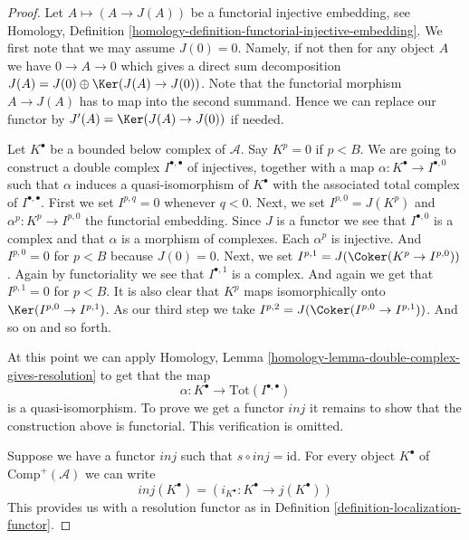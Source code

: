 \begin{proof}
Let $A \mapsto (A \to J(A))$ be a functorial injective embedding, see
Homology, Definition \ref{homology-definition-functorial-injective-embedding}.
We first note that we may assume $J(0) = 0$. Namely, if not then
for any object $A$ we have $0 \to A \to 0$ which gives
a direct sum decomposition $J(A) = J(0) \oplus \Ker(J(A) \to J(0))$.
Note that the functorial morphism $A \to J(A)$ has to map
into the second summand. Hence we can replace our functor
by $J'(A) = \Ker(J(A) \to J(0))$ if needed.

\medskip\noindent
Let $K^\bullet$ be a bounded below complex of $\mathcal{A}$.
Say $K^p = 0$ if $p < B$.
We are going to construct a double complex $I^{\bullet, \bullet}$
of injectives, together with a map $\alpha : K^\bullet \to I^{\bullet, 0}$
such that $\alpha$ induces a quasi-isomorphism of $K^\bullet$
with the associated total complex of $I^{\bullet, \bullet}$.
First we set $I^{p, q} = 0$ whenever $q < 0$.
Next, we set $I^{p, 0} = J(K^p)$ and $\alpha^p : K^p \to I^{p, 0}$
the functorial embedding. Since $J$ is a functor we see that
$I^{\bullet, 0}$ is a complex and that $\alpha$ is a
morphism of complexes. Each $\alpha^p$ is injective. And
$I^{p, 0} = 0$ for $p < B$ because $J(0) = 0$. Next, we set
$I^{p, 1} = J(\Coker(K^p \to I^{p, 0}))$. Again by functoriality
we see that $I^{\bullet, 1}$ is a complex. And again we get
that $I^{p, 1} = 0$ for $p < B$. It is also clear that
$K^p$ maps isomorphically onto $\Ker(I^{p, 0} \to I^{p, 1})$.
As our third step we take $I^{p, 2} = J(\Coker(I^{p, 0} \to I^{p, 1}))$.
And so on and so forth.

\medskip\noindent
At this point we can apply
Homology, Lemma \ref{homology-lemma-double-complex-gives-resolution}
to get that the map
$$
\alpha : K^\bullet \longrightarrow \text{Tot}(I^{\bullet, \bullet})
$$
is a quasi-isomorphism. To prove we get a functor $inj$ it
remains to show that the construction above
is functorial. This verification is omitted.

\medskip\noindent
Suppose we have a functor $inj$ such that $s \circ inj = \text{id}$.
For every object $K^\bullet$ of $\text{Comp}^{+}(\mathcal{A})$
we can write
$$
inj(K^\bullet) = (i_{K^\bullet} : K^\bullet \to j(K^\bullet))
$$
This provides us with a resolution functor as in
Definition \ref{definition-localization-functor}.
\end{proof}

